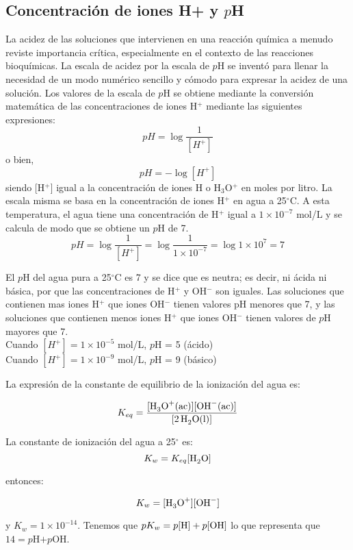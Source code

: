 \subsection{Concentraci\'on de iones H+ y $p$H}
La acidez de las soluciones que intervienen en una reacción química a menudo reviste importancia crítica, especialmente en el contexto de las reacciones bioquímicas.  La escala de acidez por la escala de  $p$H se invent\'o para llenar la necesidad de un modo num\'erico sencillo y c\'omodo para expresar la acidez de una soluci\'on. Los valores de la escala de $p$H se obtiene mediante la conversi\'on matem\'atica de las concentraciones de iones H$^+$ mediante las siguientes expresiones:
\begin{equation}
pH = \log \frac{1}{[H^+]}
\end{equation}
o bien,
\begin{equation}
 pH = -\log [H^+]
\label{ph:1}
\end{equation}
 siendo  [H$^+$] igual a la concentraci\'on de iones  H o  H$_3$O$^+$ en moles
por litro. La escala misma se basa en la concentraci\'on de iones H$^+$
en agua a 25$^\circ$C. A esta temperatura, el agua tiene una
concentraci\'on de H$^+$ igual a $1\times10^{-7}$ mol/L y se calcula de
modo que se obtiene un $p$H de 7.
$$
pH = \log \frac{1}{[H^+]}=\log \frac{1}{1\times 10^{-7}}=\log 1\times
10^7 = 7
$$

El $p$H del agua pura a 25$^\circ$C es 7 y se dice que es neutra; es
decir, ni \'acida ni b\'asica, por que las concentraciones de H$^+$ y
OH$^-$ son iguales. Las soluciones que contienen mas iones H$^+$ que
iones OH$^-$ tienen valores pH menores que 7, y las soluciones que
contienen menos iones H$^+$ que iones OH$^-$ tienen valores de $p$H
mayores que 7.\\
Cuando $[H^+] = 1\times 10^{-5}$ mol/L, $p$H = 5 (\'acido)\\
Cuando $[H^+] = 1\times 10^{-9}$ mol/L, $p$H = 9 (b\'asico)

\begin{example}
\begin{center}
\end{center}

La expresi\'on de la constante de equilibrio de la ionizaci\'on del agua es:

\begin{equation}
  K_{eq} = \frac{[\ce{H3O+ (ac)}][\ce{OH^- (ac)}]}{[\ce{2H2O (l)}]} 
\end{equation}

La constante de ionizaci\'on del agua a 25$^\circ$ es:
\begin{equation}
  K_w = K_{eq} [\ce{H2O}]
\end{equation}

entonces:

\begin{equation}
 K_w = [\ce{H3O^+}][\ce{OH^-}]
\end{equation}

y $ K_w = 1\times 10^{-14}$. Tenemos que  $pK_w = p[\ce{H}]  + p[\ce{OH}] $  lo que representa que  $14 = p$H$ + p$OH.
\end{example}

